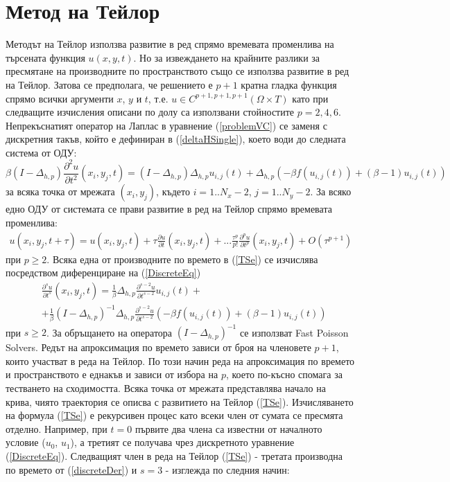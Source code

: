 \documentclass{article}
\newcommand{\be}{\begin{equation}}
\newcommand{\ee}{\end{equation}}
\newcommand{\rf}[1]{(\ref{#1})}
\begin{document}
\section{ Метод на Тейлор }
Методът на Тейлор използва развитие в ред спрямо времевата променлива на търсената функция $u(x,y,t)$. Но за извеждането на крайните разлики за пресмятане на производните по пространството също се използва развитие в ред на Тейлор. Затова се предполага, че решението е $p+1$ кратна гладка функция спрямо всички аргументи $x$, $y$ и $t$, т.е. $u \in C^{p+1,p+1,p+1}(\Omega \times T)$ като при следващите изчисления описани по долу са използвани стойностите $p=2,4,6$. Непрекъснатият оператор на Лаплас в уравнение \rf{problemVC} се заменя с дискретния такъв, който е дефиниран в \rf{deltaHSingle}, което води до следната система от ОДУ:
\be \label{DiscreteEq}
\beta (I-\Delta_{h,p}) \frac{\partial^2 u}{\partial t^2}(x_i, y_j, t)=
 (I - \Delta_{h,p})\Delta_{h,p} u_{i, j}(t) + \Delta_{h,p} ( -\beta f( u_{i, j}(t) ) + (\beta-1) u_{i, j}(t) )
\ee
за всяка точка от мрежата $(x_i, y_j)$, където $i = 1..N_x-2$, $j=1..N_y-2$. За всяко едно ОДУ от системата се прави развитие в ред на Тейлор спрямо времевата променлива:
\begin{align} \label{TSe}
u(x_i, y_j, t+\tau) = u(x_i, y_j, t) + \tau \frac{ \partial u }{ \partial t }(x_i, y_j, t)  + ... 
\frac{ \tau^p }{ p! } \frac{ \partial^p u }{ \partial t^p }(x_i, y_j, t) + O(\tau^{p+1})
\end{align}
при $p \ge 2$. Всяка една от производните по времето в \rf{TSe} се изчислява посредством диференциране на \rf{DiscreteEq}
\begin{align}\label{discreteDer}
&\frac{\partial^s u}{\partial t^s}(x_i, y_j, t)= \frac{1}{\beta} \Delta_{h,p} \frac{\partial^{s-2} u}{\partial t^{s-2}} u_{i, j}(t) + \nonumber \\ 
&+\frac{1}{\beta} (I-\Delta_{h,p})^{-1} \Delta_{h,p} \frac{\partial^{s-2} u}{\partial t^{s-2}} ( -\beta f( u_{i, j}(t) ) + (\beta-1) u_{i, j}(t) ) 
\end{align}
при $s \ge 2$. За обръщането на оператора $(I-\Delta_{h,p})^{-1}$ се използват Fast Poisson Solvers. Редът на апроксимация по времето зависи от броя на членовете $p+1$, които участват в реда на Тейлор. По този начин реда на апроксимация по времето и пространството е еднакъв и зависи от избора на $p$, което по-късно спомага за тестването на сходимостта. Всяка точка от мрежата представлява начало на крива, чиято траектория се описва с развитието на Тейлор \rf{TSe}. Изчисляването на формула \rf{TSe} е рекурсивен процес като всеки член от сумата се пресмята отделно. Например, при $t=0$ първите два члена са известни от началното условие ($u_0$, $u_1$), а третият се получава чрез дискретното уравнение \rf{DiscreteEq}.  Следващият член в реда на Тейлор \rf{TSe} - третата производна по времето от \rf{discreteDer} и $s=3$ - изглежда по следния начин:
\end{document}
